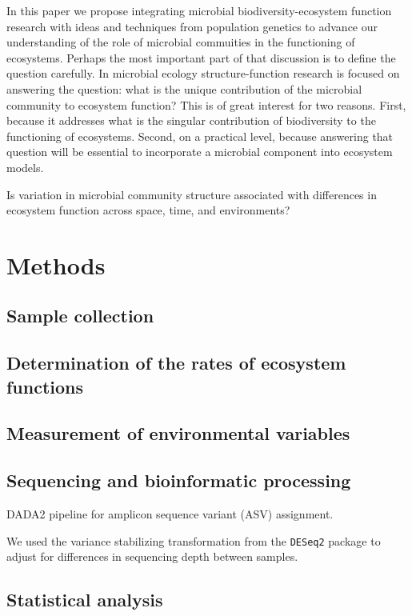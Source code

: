\documentclass{article}
\begin{document}
In this paper we propose integrating microbial biodiversity-ecosystem function
research with ideas and techniques from population genetics to advance our
understanding of the role of microbial commuities in the functioning of
ecosystems. Perhaps the most important part of that discussion is to define the
question carefully. In microbial ecology
structure-function research is focused on answering the question: what is the
unique contribution of the microbial community to ecosystem function? This is of
great interest for two reasons. First, because it addresses what is the singular
contribution of biodiversity to the functioning of ecosystems. Second, on a
practical level, because answering that question will be essential to
incorporate a microbial component into ecosystem models.

Is variation in microbial community
structure associated with differences in ecosystem function across space,
time, and environments?
\section{Methods}

\subsection{Sample collection}

\subsection{Determination of the rates of ecosystem functions}

\subsection{Measurement of environmental variables}

\subsection{Sequencing and bioinformatic processing}

DADA2 pipeline for amplicon sequence variant (ASV) assignment.

We used the variance stabilizing transformation from the \texttt{DESeq2}
package to adjust for differences in sequencing depth between samples. 

\subsection{Statistical analysis}
\end{document}
